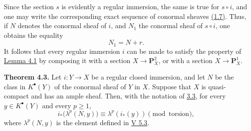 Since the section \(s\) is evidently a regular immersion, the same is true for \(s\circ i\), and one may write the corresponding exact sequence of conormal sheaves \hyperlink{sga6.e07.prop.1-7}{(1.7)}. Thus, if \(N\) denotes the conormal sheaf of \(i\), and \(N_1\) the conormal sheaf of \(s\circ i\), one obtains the equality
\[
  N_1=N+r.
\]
It follows that every regular immersion \(i\) can be made to satisfy the property of \hyperlink{sga6.e07.lem.4-1}{Lemma 4.1} by composing it with a section \(X\to\mathbf P_X^2\), or with a section \(X\to\mathbf P_X^1\).

\textbf{Theorem 4.3.} Let \(i:Y\to X\) be a regular closed immersion, and let \(N\) be the class in \(K^\bullet(Y)\) of the conormal sheaf of \(Y\) in \(X\). Suppose that \(X\) is quasi-compact and has an ample sheaf. Then, with the notation of \hyperlink{sga6.e07.para.3-3}{3.3}, for every \(y\in K^\bullet(Y)\) and every \(p\ge1\),
\begin{equation}\tag{4.3.1}
 i_*\bigl(\lambda^p(N,y)\bigr)\equiv \lambda^p(i_*(y))
 \pmod{\text{torsion}},
\end{equation}
where \(\lambda^p(N,y)\) is the element defined in \hyperlink{sga6.e05.def.5-3}{V 5.3}.

